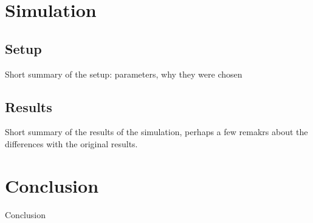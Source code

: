 \documentclass[a4paper]{article}
\begin{document}
\clearpage

\section{Simulation}
\subsection{Setup}
Short summary of the setup: parameters, why they were chosen

\subsection{Results}
Short summary of the results of the simulation, perhaps a few remakrs about the differences with the original results.

\clearpage

\section{Conclusion}
Conclusion

\clearpage
\end{document}
